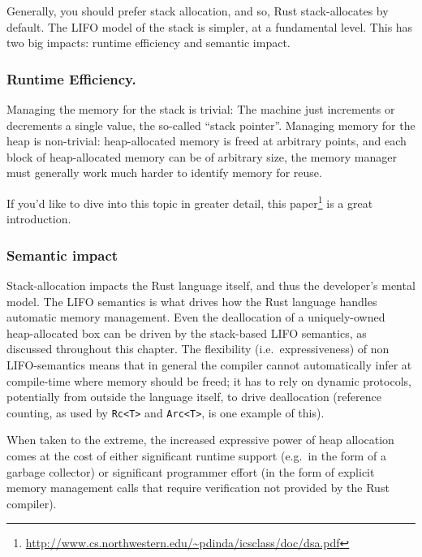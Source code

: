 \documentclass[a4paper,]{book}
\renewcommand{\href}[2]{#2\footnote{\url{#1}}}
\begin{document}
Generally, you should prefer stack allocation, and so, Rust
stack-allocates by default. The LIFO model of the stack is simpler, at a
fundamental level. This has two big impacts: runtime efficiency and
semantic impact.

\subsubsection{Runtime Efficiency.}\label{runtime-efficiency.}

Managing the memory for the stack is trivial: The machine just
increments or decrements a single value, the so-called ``stack
pointer''. Managing memory for the heap is non-trivial: heap-allocated
memory is freed at arbitrary points, and each block of heap-allocated
memory can be of arbitrary size, the memory manager must generally work
much harder to identify memory for reuse.

If you'd like to dive into this topic in greater detail,
\href{http://www.cs.northwestern.edu/~pdinda/icsclass/doc/dsa.pdf}{this
paper} is a great introduction.

\subsubsection{Semantic impact}\label{semantic-impact}

Stack-allocation impacts the Rust language itself, and thus the
developer's mental model. The LIFO semantics is what drives how the Rust
language handles automatic memory management. Even the deallocation of a
uniquely-owned heap-allocated box can be driven by the stack-based LIFO
semantics, as discussed throughout this chapter. The flexibility
(i.e.~expressiveness) of non LIFO-semantics means that in general the
compiler cannot automatically infer at compile-time where memory should
be freed; it has to rely on dynamic protocols, potentially from outside
the language itself, to drive deallocation (reference counting, as used
by \texttt{Rc\textless{}T\textgreater{}} and
\texttt{Arc\textless{}T\textgreater{}}, is one example of this).

When taken to the extreme, the increased expressive power of heap
allocation comes at the cost of either significant runtime support
(e.g.~in the form of a garbage collector) or significant programmer
effort (in the form of explicit memory management calls that require
verification not provided by the Rust compiler).

\end{document}
